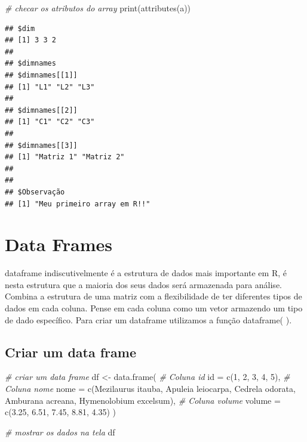 \documentclass[
]{article}
\newenvironment{Shaded}{\begin{snugshade}}{\end{snugshade}}
\newcommand{\AttributeTok}[1]{\textcolor[rgb]{0.77,0.63,0.00}{#1}}
\newcommand{\CommentTok}[1]{\textcolor[rgb]{0.56,0.35,0.01}{\textit{#1}}}
\newcommand{\DecValTok}[1]{\textcolor[rgb]{0.00,0.00,0.81}{#1}}
\newcommand{\FloatTok}[1]{\textcolor[rgb]{0.00,0.00,0.81}{#1}}
\newcommand{\FunctionTok}[1]{\textcolor[rgb]{0.00,0.00,0.00}{#1}}
\newcommand{\NormalTok}[1]{#1}
\newcommand{\OtherTok}[1]{\textcolor[rgb]{0.56,0.35,0.01}{#1}}
\newcommand{\StringTok}[1]{\textcolor[rgb]{0.31,0.60,0.02}{#1}}
\begin{document}
\begin{Shaded}
\begin{Highlighting}[]
\CommentTok{\# checar os atributos do array}
\FunctionTok{print}\NormalTok{(}\FunctionTok{attributes}\NormalTok{(a))}
\end{Highlighting}
\end{Shaded}

\begin{verbatim}
## $dim
## [1] 3 3 2
## 
## $dimnames
## $dimnames[[1]]
## [1] "L1" "L2" "L3"
## 
## $dimnames[[2]]
## [1] "C1" "C2" "C3"
## 
## $dimnames[[3]]
## [1] "Matriz 1" "Matriz 2"
## 
## 
## $Observação
## [1] "Meu primeiro array em R!!"
\end{verbatim}

\hypertarget{data-frames}{%
\section{Data Frames}\label{data-frames}}

dataframe indiscutivelmente é a estrutura de dados mais importante em R,
é nesta estrutura que a maioria dos seus dados será armazenada para
análise. Combina a estrutura de uma matriz com a flexibilidade de ter
diferentes tipos de dados em cada coluna. Pense em cada coluna como um
vetor armazendo um tipo de dado específico. Para criar um dataframe
utilizamos a função dataframe( ).

\hypertarget{criar-um-data-frame}{%
\subsection{Criar um data frame}\label{criar-um-data-frame}}

\begin{Shaded}
\begin{Highlighting}[]
\CommentTok{\# criar um data frame}
\NormalTok{df }\OtherTok{\textless{}{-}} \FunctionTok{data.frame}\NormalTok{(}
    \CommentTok{\# Coluna id}
    \AttributeTok{id =} \FunctionTok{c}\NormalTok{(}\DecValTok{1}\NormalTok{, }\DecValTok{2}\NormalTok{, }\DecValTok{3}\NormalTok{, }\DecValTok{4}\NormalTok{, }\DecValTok{5}\NormalTok{),}
    \CommentTok{\# Coluna nome}
    \AttributeTok{nome =} \FunctionTok{c}\NormalTok{(}\StringTok{\textquotesingle{}Mezilaurus itauba\textquotesingle{}}\NormalTok{, }\StringTok{\textquotesingle{}Apuleia leiocarpa\textquotesingle{}}\NormalTok{, }\StringTok{\textquotesingle{}Cedrela odorata\textquotesingle{}}\NormalTok{, }
             \StringTok{\textquotesingle{}Amburana acreana\textquotesingle{}}\NormalTok{, }\StringTok{\textquotesingle{}Hymenolobium excelsum\textquotesingle{}}\NormalTok{),}
    \CommentTok{\# Coluna volume}
    \AttributeTok{volume =} \FunctionTok{c}\NormalTok{(}\FloatTok{3.25}\NormalTok{, }\FloatTok{6.51}\NormalTok{, }\FloatTok{7.45}\NormalTok{, }\FloatTok{8.81}\NormalTok{, }\FloatTok{4.35}\NormalTok{)}
\NormalTok{)}

\CommentTok{\# mostrar os dados na tela}
\NormalTok{df}
\end{Highlighting}
\end{Shaded}
\end{document}
